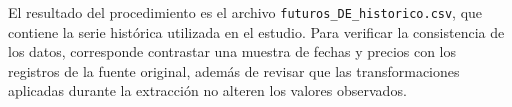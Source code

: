 \documentclass[11pt,letterpaper]{article}
\theoremstyle{plain}
\theoremstyle{definition}
\theoremstyle{remark}
\numberwithin{equation}{section}
\begin{document}
\vspace{0.2cm}


El resultado del procedimiento es el archivo
\texttt{futuros\_DE\_historico.csv}, que contiene la serie
histórica utilizada en el estudio. Para verificar la
consistencia de los datos, corresponde contrastar una
muestra de fechas y precios con los registros de la fuente
original, además de revisar que las transformaciones
aplicadas durante la extracción no alteren los valores
observados.

\clearpage
  \printbibliography[title={Referencias bibliográficas}]
\end{document}
